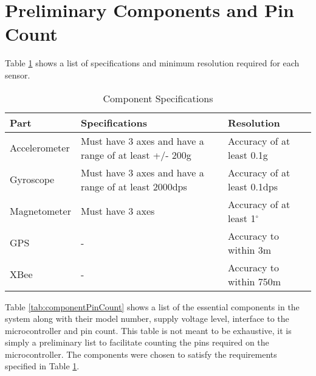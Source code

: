 \section{Preliminary Components and Pin Count}

Table \ref{tab:sensorResolution} shows a list of specifications and minimum resolution required for each sensor.

\begin{table}[H]
\setlength{\extrarowheight}{1.5pt}
  \centering
  \caption{Component Specifications}
    \begin{tabular}{|m{1in}|m{2.2in}|m{2.2in}|}
    \hline
     Part  &  Specifications &  Resolution \\
    \hline \hline
    Accelerometer & Must have 3 axes and have a range of at least +/- 200g & Accuracy of at least 0.1g \\ \hline
    Gyroscope & Must have 3 axes and have a range of at least 2000dps & Accuracy of at least 0.1dps \\ \hline
    Magnetometer & Must have 3 axes  & Accuracy of at least 1$^{\circ}$ \\ \hline
    GPS   & - & Accuracy to within 3m  \\ \hline 
    XBee  & - & Accuracy to within 750m \\ \hline
    
    \end{tabular}%
  \label{tab:sensorResolution}%
\end{table}%

Table \ref{tab:componentPinCount} shows a list of the essential components in the system along with their model number, supply voltage level, interface to the microcontroller and pin count.  This table is not meant to be exhaustive, it is simply a preliminary list to facilitate counting the pins required on the microcontroller. The components were chosen to satisfy the requirements specified in Table \ref{tab:sensorResolution}.

